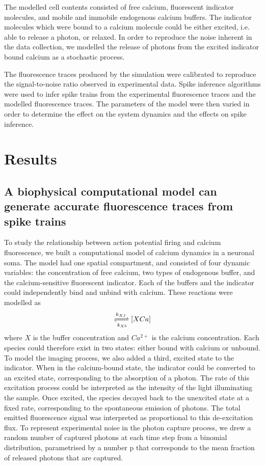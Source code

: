 \documentclass[a4paper,12pt]{article}
\theoremstyle{definition}
\begin{document}
The modelled cell contents consisted of free calcium, fluorescent indicator molecules, and mobile and immobile endogenous calcium buffers. The indicator molecules which were bound to a calcium molecule could be either excited, i.e. able to release a photon, or relaxed. In order to reproduce the noise inherent in the data collection, we modelled the release of photons from the excited indicator bound calcium as a stochastic process.

The fluorescence traces produced by the simulation were calibrated to reproduce the signal-to-noise ratio observed in experimental data. Spike inference algorithms were used to infer spike trains from the experimental fluorescence traces and the modelled fluorescence traces. The parameters of the model were then varied in order to determine the effect on the system dynamics and the effects on spike inference.

\section{Results}
\subsection{A biophysical computational model can generate accurate fluorescence traces from spike trains}
To study the relationship between action potential firing and calcium fluorescence, we built a computational model of calcium dynamics in a neuronal soma. The model had one spatial compartment, and consisted of four dynamic variables: the concentration of free calcium, two types of endogenous buffer, and the calcium-sensitive fluorescent indicator. Each of the buffers and the indicator could independently bind and unbind with calcium. These reactions were modelled as 
\begin{align*}
   [X][Ca^{2+}] \xrightleftharpoons[k_{Xb}]{k_{Xf}} [XCa]
\end{align*}
where $X$ is the buffer concentration and $Ca^{2+}$ is the calcium concentration. Each species could therefore exist in two states: either bound with calcium or unbound. To model the imaging process, we also added a third, excited state to the indicator. When in the calcium-bound state, the indicator could be converted to an excited state, corresponding to the absorption of a photon. The rate of this excitation process could be interpreted as the intensity of the light illuminating the sample. Once excited, the species decayed back to the unexcited state at a fixed rate, corresponding to the spontaneous emission of photons. The total emitted fluorescence signal was interpreted as proportional to this de-excitation flux. To represent experimental noise in the photon capture process, we drew a random number of captured photons at each time step from a binomial distribution, parametrised by a number p that corresponds to the mean fraction of released photons that are captured.
\end{document}
